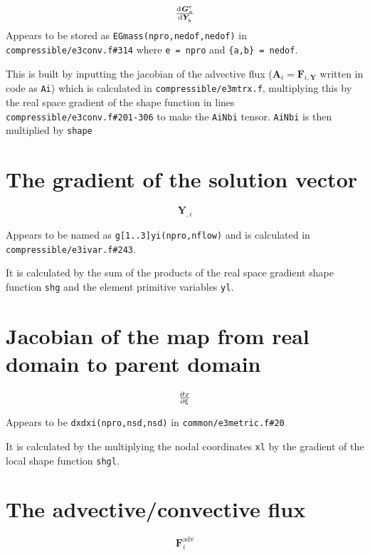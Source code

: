 \documentclass[12pt, letterpaper, twoside]{article}
\renewcommand{\vec}[1]{\bm{#1}}
\newcommand{\ttt}[1]{\texttt{#1}}
\newcommand{\A}{\vec{A}}
\newcommand{\Y}{\vec{Y}}
\newcommand{\F}{\vec{F}}
\newcommand{\G}{\vec{G}}
\newcommand{\0}{\vec{0}}
\begin{document}
    \begin{equation}
        \od{\G^e_a}{\Y_b}
    \end{equation}
    Appears to be stored as \ttt{EGmass(npro,nedof,nedof)} in \ttt{compressible/e3conv.f\#314} where \ttt{e = npro} and \ttt{\{a,b\} = nedof}.

    This is built by inputting the jacobian of the advective flux (\(\A_i = \F_{i,\vec{Y}}\) written in code as \ttt{Ai}) which is calculated in \ttt{compressible/e3mtrx.f}, multiplying this by the real space gradient of the shape function in lines \ttt{compressible/e3conv.f\#201-306} to make the \ttt{AiNbi} tensor. \ttt{AiNbi} is then multiplied by \ttt{shape}

\section{The gradient of the solution vector}

    \begin{equation}
        \Y_{,i}
    \end{equation}

    Appears to be named as \ttt{g[1..3]yi(npro,nflow)} and is calculated in \ttt{compressible/e3ivar.f\#243}.

    It is calculated by the sum of the products of the real space gradient shape function \ttt{shg} and the element primitive variables \ttt{yl}.

\section{Jacobian of the map from real domain to parent domain}

    \begin{equation}
        \pd{x}{\xi}
    \end{equation}

    Appears to be \ttt{dxdxi(npro,nsd,nsd)} in \ttt{common/e3metric.f\#20} 

    It is calculated by the multiplying the nodal coordinates \ttt{xl} by the gradient of the local shape function \ttt{shgl}.

\section{The advective/convective flux}

    \begin{equation}
        \F_i^{\text{adv}}
    \end{equation}
\end{document}

